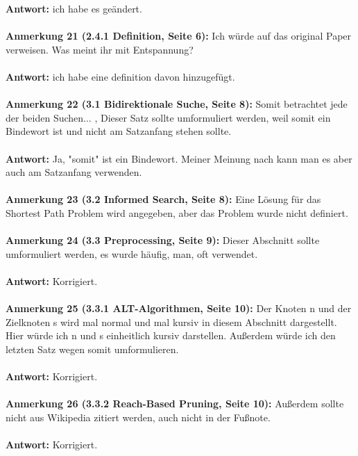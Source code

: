 \documentclass[a4paper,12pt]{book}
\begin{document}
\textbf{Antwort:} ich habe es geändert.
\\ \\
\textbf{Anmerkung 21 (2.4.1 Definition, Seite 6):}
Ich würde auf das original Paper verweisen. 
Was meint ihr mit Entspannung?
 \\  \\
\textbf{Antwort:} ich habe eine definition davon hinzugefügt.
\\ \\
\textbf{Anmerkung 22 (3.1 Bidirektionale Suche, Seite 8):}
\grqq Somit betrachtet jede der beiden Suchen... \glqq{}, Dieser Satz sollte umformuliert werden, weil somit ein Bindewort ist und nicht am Satzanfang stehen sollte. 
\\ \\
\textbf{Antwort:}
Ja, "somit" ist ein Bindewort. Meiner Meinung nach kann man es aber auch am Satzanfang verwenden.
\\ \\
\textbf{Anmerkung 23 (3.2 Informed Search, Seite 8):}
Eine Lösung für das Shortest Path Problem wird angegeben, aber das Problem wurde nicht definiert.
\\ \\
\textbf{Anmerkung 24 (3.3 Preprocessing, Seite 9):} 
Dieser Abschnitt sollte umformuliert werden, es wurde \glqq häufig, man, oft\grqq{} verwendet. 
\\ \\
\textbf{Antwort:}
Korrigiert. 
\\ \\
\textbf{Anmerkung 25 (3.3.1 ALT-Algorithmen, Seite 10):}
Der Knoten n und der Zielknoten s wird mal normal und mal kursiv in diesem Abschnitt dargestellt. Hier würde ich n und s einheitlich kursiv darstellen. Außerdem würde ich den letzten Satz wegen \glqq somit\grqq{} umformulieren.
\\ \\
\textbf{Antwort:}
Korrigiert.
\\ \\
\textbf{Anmerkung 26 (3.3.2 Reach-Based Pruning, Seite 10):}
Außerdem sollte nicht aus Wikipedia zitiert werden, auch nicht in der Fußnote.
\\ \\
\textbf{Antwort:}
Korrigiert.
\end{document}
